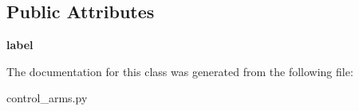 \subsection*{Public Attributes}
\begin{DoxyCompactItemize}
\item 
\hypertarget{classcontrol__arms_1_1Example_a8d7538a6cd0eb119cd8d656ddadc2238}{{\bfseries label}}\label{classcontrol__arms_1_1Example_a8d7538a6cd0eb119cd8d656ddadc2238}

\end{DoxyCompactItemize}


The documentation for this class was generated from the following file\-:\begin{DoxyCompactItemize}
\item 
control\-\_\-arms.\-py\end{DoxyCompactItemize}
